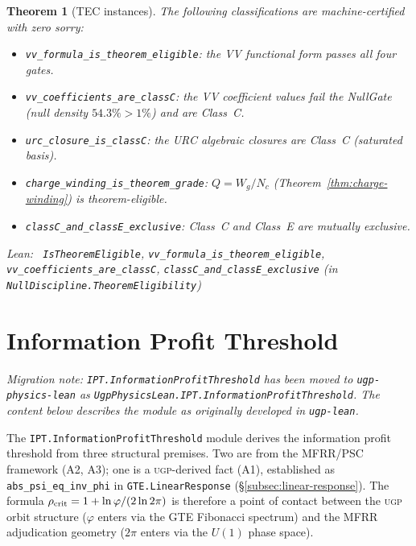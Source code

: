 \documentclass[11pt,a4paper]{article}
\newenvironment{leanref}%
  {\par\smallskip\noindent\begingroup\raggedright\textup{Lean:}~}%
  {\par\endgroup}
\newtheorem{theorem}{Theorem}[section]
\theoremstyle{definition}
\newcommand{\ugp}{\textsc{ugp}}
\begin{document}
\begin{theorem}[TEC instances]\label{thm:tec-instances}
The following classifications are machine-certified with zero sorry:
\begin{itemize}[nosep]
\item \lstinline|vv_formula_is_theorem_eligible|: the VV functional form passes all four gates.
\item \lstinline|vv_coefficients_are_classC|: the VV coefficient values fail the NullGate (null density $54.3\% > 1\%$) and are Class~C.
\item \lstinline|urc_closure_is_classC|: the URC algebraic closures are Class~C (saturated basis).
\item \lstinline|charge_winding_is_theorem_grade|: $Q = W_g/N_c$ (Theorem~\ref{thm:charge-winding}) is theorem-eligible.
\item \lstinline|classC_and_classE_exclusive|: Class~C and Class~E are mutually exclusive.
\end{itemize}

\begin{leanref} \lstinline|IsTheoremEligible|, \lstinline|vv_formula_is_theorem_eligible|,
\lstinline|vv_coefficients_are_classC|, \lstinline|classC_and_classE_exclusive|
\textup{(in \texttt{NullDiscipline.TheoremEligibility})}
\end{leanref}
\end{theorem}

\section{Information Profit Threshold}\label{sec:ipt}

\noindent\textit{Migration note: \texttt{IPT.InformationProfitThreshold} has been moved to
\texttt{ugp-physics-lean} as \texttt{UgpPhysicsLean.IPT.InformationProfitThreshold}.
The content below describes the module as originally developed in \texttt{ugp-lean}.}

The \texttt{IPT.InformationProfitThreshold} module derives the information profit threshold
from three structural premises.  Two are from the MFRR/PSC framework (A2, A3); one is
a \ugp{}-derived fact (A1), established as \lstinline|abs_psi_eq_inv_phi| in
\texttt{GTE.LinearResponse} (\S\ref{subsec:linear-response}).
The formula $\rho_{\rm crit} = 1 + \ln\varphi/(2\ln 2\pi)$ is therefore a point of
contact between the \ugp{} orbit structure ($\varphi$ enters via the GTE Fibonacci
spectrum) and the MFRR adjudication geometry ($2\pi$ enters via the $U(1)$ phase space).
\end{document}
